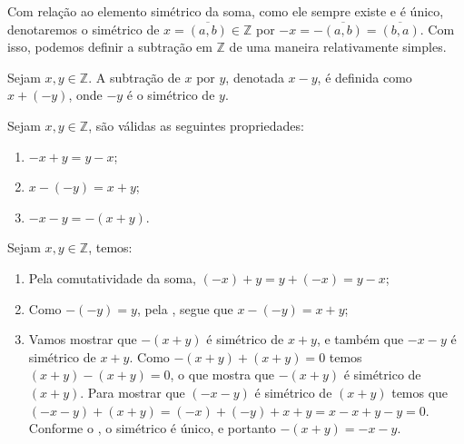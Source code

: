 \documentclass[../main.tex]{subfiles}
\begin{document}
\begin{obs}\label{int-obs-notacaoSimetrico}
    Com relação ao elemento simétrico da soma, como ele sempre existe e é único, denotaremos o simétrico de $x = \overline{(a,b)} \in \mathbb{Z}$ por $-x = -\overline{(a,b)} = \overline{(b,a)}$. Com isso, podemos definir a subtração em $\mathbb{Z}$ de uma maneira relativamente simples.  
\end{obs}

\begin{defi}\label{int-def-subtracao}
    Sejam $x,y \in \mathbb{Z}$. A subtração de $x$ por $y$, denotada $x - y$, é definida como $x + (-y)$, onde $-y$ é o simétrico de $y$.
\end{defi}
\begin{prop} 
    Sejam $x,y \in \mathbb{Z}$, são válidas as seguintes propriedades:
    \begin{enumerate}[label=(\roman*)]
        \item $-x + y = y - x$;
        \item $x - ( - y) = x+y$;
        \item $-x-y = -(x+y)$.
    \end{enumerate}
\end{prop}
\begin{dem}
    Sejam $x, y \in \mathbb{Z}$, temos:
        \begin{enumerate}[label=(\roman*)]
        \item Pela comutatividade da soma, $(-x) + y = y + (-x) = y-x$;
        \item Como $-(-y) = y$, pela , segue que $x - ( - y) = x+y$;
        \item Vamos mostrar que $-(x+y)$ é simétrico de $x+y$, e também que $-x-y$ é simétrico de $x+y$. Como $-(x+y) + (x+y) = 0$
            temos $(x+y) -(x+y) = 0$, o que mostra que $-(x+y)$ é simétrico de $(x+y)$. Para mostrar que $(-x-y)$ é simétrico de $(x+y)$ temos que 
            $(-x-y)+(x+y) = (-x)+(-y)+x+y = x-x+y-y = 0$. Conforme o , o simétrico é único, e portanto $-(x+y)=-x-y$.
    \end{enumerate}
\end{dem}
\end{document}
